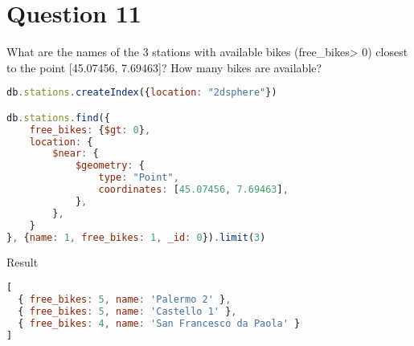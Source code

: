 \section{Question 11}

\begin{question}
  What are the names of the 3 stations with available bikes (free\_bikes> 0)
  closest to the point [45.07456, 7.69463]? How many bikes are available?
\end{question}

\begin{answer}

  \begin{lstlisting}[language=js]
db.stations.createIndex({location: "2dsphere"})

db.stations.find({
    free_bikes: {$gt: 0},
    location: {
        $near: {
            $geometry: {
                type: "Point",
                coordinates: [45.07456, 7.69463],
            },
        },
    }
}, {name: 1, free_bikes: 1, _id: 0}).limit(3)

  \end{lstlisting}
  Result
  \begin{lstlisting}[language=js]
[
  { free_bikes: 5, name: 'Palermo 2' },
  { free_bikes: 5, name: 'Castello 1' },
  { free_bikes: 4, name: 'San Francesco da Paola' }
]
  \end{lstlisting}

\end{answer}
\pagebreak
